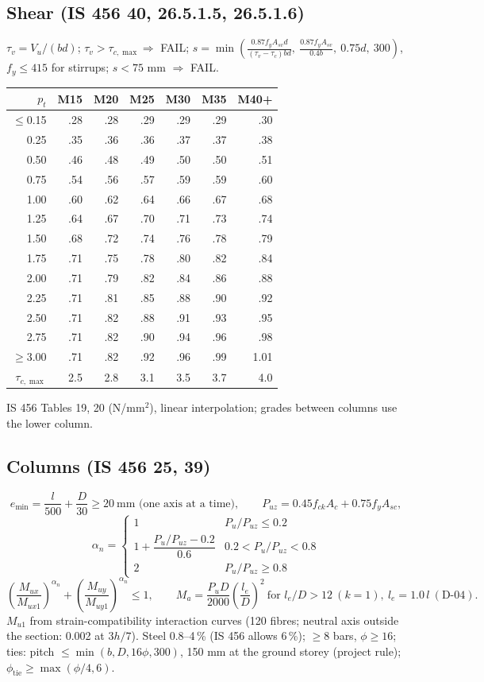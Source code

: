 \documentclass[10pt,a4paper]{article}
\newcommand{\fck}{f_{ck}}
\newcommand{\fy}{f_{y}}
\begin{document}
\subsection{Shear (IS 456 40, 26.5.1.5, 26.5.1.6)}
$\tau_v=V_u/(bd)$; $\tau_v>\tau_{c,\max}\Rightarrow$ FAIL;
$s=\min\!\left(\frac{0.87f_yA_{sv}d}{(\tau_v-\tau_c)bd},\ \frac{0.87f_yA_{sv}}{0.4b},\ 0.75d,\ 300\right)$,
$f_y\le415$ for stirrups; $s<75$ mm $\Rightarrow$ FAIL.

\begin{longtable}{rrrrrrr}
\toprule $p_t$ & M15 & M20 & M25 & M30 & M35 & M40+ \\ \midrule \endhead
$\le$0.15 & .28 & .28 & .29 & .29 & .29 & .30 \\ 0.25 & .35 & .36 & .36 & .37 & .37 & .38 \\
0.50 & .46 & .48 & .49 & .50 & .50 & .51 \\ 0.75 & .54 & .56 & .57 & .59 & .59 & .60 \\
1.00 & .60 & .62 & .64 & .66 & .67 & .68 \\ 1.25 & .64 & .67 & .70 & .71 & .73 & .74 \\
1.50 & .68 & .72 & .74 & .76 & .78 & .79 \\ 1.75 & .71 & .75 & .78 & .80 & .82 & .84 \\
2.00 & .71 & .79 & .82 & .84 & .86 & .88 \\ 2.25 & .71 & .81 & .85 & .88 & .90 & .92 \\
2.50 & .71 & .82 & .88 & .91 & .93 & .95 \\ 2.75 & .71 & .82 & .90 & .94 & .96 & .98 \\
$\ge$3.00 & .71 & .82 & .92 & .96 & .99 & 1.01 \\ \midrule
$\tau_{c,\max}$ & 2.5 & 2.8 & 3.1 & 3.5 & 3.7 & 4.0 \\ \bottomrule
\end{longtable}
IS 456 Tables 19, 20 (N/mm$^2$), linear interpolation; grades between columns use the lower column.

\subsection{Columns (IS 456 25, 39)}
\[
e_\text{min}=\frac{l}{500}+\frac D{30}\ge20\ \text{mm (one axis at a time)},\qquad
P_{uz}=0.45\fck A_c+0.75\fy A_{sc},
\]
\[
\alpha_n=\begin{cases}1 & P_u/P_{uz}\le0.2\\[2pt] 1+\dfrac{P_u/P_{uz}-0.2}{0.6} & 0.2<P_u/P_{uz}<0.8\\[6pt]
2 & P_u/P_{uz}\ge0.8\end{cases}
\]
\[
\left(\frac{M_{ux}}{M_{ux1}}\right)^{\alpha_n}+\left(\frac{M_{uy}}{M_{uy1}}\right)^{\alpha_n}\le1,\qquad
M_a=\frac{P_uD}{2000}\left(\frac{l_e}{D}\right)^2\ \text{for } l_e/D>12\ (k=1),\ l_e=1.0\,l\ (\text{D-04}).
\]
$M_{u1}$ from strain-compatibility interaction curves (120 fibres; neutral axis outside the section: 0.002 at
$3h/7$). Steel 0.8--4\,\% (IS 456 allows 6\,\%); $\ge8$ bars, $\phi\ge16$; ties: pitch $\le\min(b,D,16\phi,300)$,
150 mm at the ground storey (project rule); $\phi_\text{tie}\ge\max(\phi/4,6)$.
\end{document}
